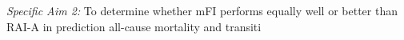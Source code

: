\emph{Specific Aim 2:} To determine whether mFI performs equally well or better than RAI-A in prediction all-cause mortality and transiti